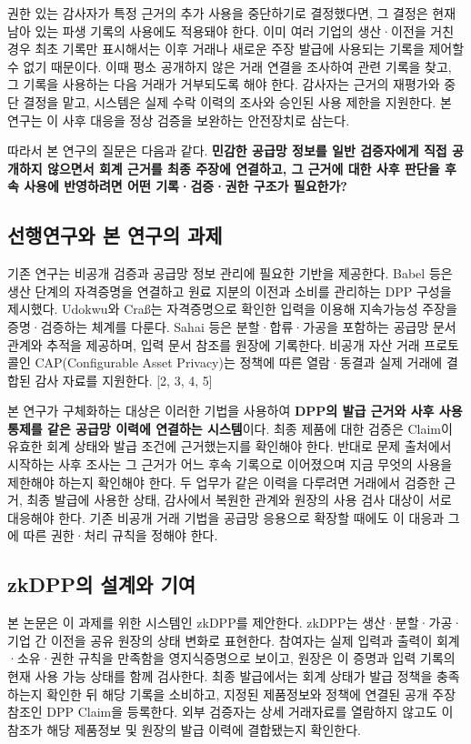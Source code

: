 권한 있는 감사자가 특정 근거의 추가 사용을 중단하기로 결정했다면, 그 결정은 현재 남아 있는 파생 기록의 사용에도 적용돼야 한다.
이미 여러 기업의 생산·이전을 거친 경우 최초 기록만 표시해서는 이후 거래나 새로운 주장 발급에 사용되는 기록을 제어할 수 없기 때문이다.
이때 평소 공개하지 않은 거래 연결을 조사하여 관련 기록을 찾고, 그 기록을 사용하는 다음 거래가 거부되도록 해야 한다.
감사자는 근거의 재평가와 중단 결정을 맡고, 시스템은 실제 수락 이력의 조사와 승인된 사용 제한을 지원한다.
본 연구는 이 사후 대응을 정상 검증을 보완하는 안전장치로 삼는다.

따라서 본 연구의 질문은 다음과 같다.
\textbf{민감한 공급망 정보를 일반 검증자에게 직접 공개하지 않으면서 회계 근거를 최종 주장에 연결하고, 그 근거에 대한 사후 판단을 후속 사용에 반영하려면 어떤 기록·검증·권한 구조가 필요한가?}


\subsection{선행연구와 본 연구의 과제}
기존 연구는 비공개 검증과 공급망 정보 관리에 필요한 기반을 제공한다.
Babel 등은 생산 단계의 자격증명을 연결하고 원료 지분의 이전과 소비를 관리하는 DPP 구성을 제시했다.
Udokwu와 Craß는 자격증명으로 확인한 입력을 이용해 지속가능성 주장을 증명·검증하는 체계를 다룬다.
Sahai 등은 분할·합류·가공을 포함하는 공급망 문서 관계와 추적을 제공하며, 입력 문서 참조를 원장에 기록한다.
비공개 자산 거래 프로토콜인 CAP(Configurable Asset Privacy)는 정책에 따른 열람·동결과 실제 거래에 결합된 감사 자료를 지원한다. [2, 3, 4, 5]

본 연구가 구체화하는 대상은 이러한 기법을 사용하여 \textbf{DPP의 발급 근거와 사후 사용 통제를 같은 공급망 이력에 연결하는 시스템}이다.
최종 제품에 대한 검증은 Claim이 유효한 회계 상태와 발급 조건에 근거했는지를 확인해야 한다.
반대로 문제 출처에서 시작하는 사후 조사는 그 근거가 어느 후속 기록으로 이어졌으며 지금 무엇의 사용을 제한해야 하는지 확인해야 한다.
두 업무가 같은 이력을 다루려면 거래에서 검증한 근거, 최종 발급에 사용한 상태, 감사에서 복원한 관계와 원장의 사용 검사 대상이 서로 대응해야 한다.
기존 비공개 거래 기법을 공급망 응용으로 확장할 때에도 이 대응과 그에 따른 권한·처리 규칙을 정해야 한다.


\subsection{zkDPP의 설계와 기여}
본 논문은 이 과제를 위한 시스템인 zkDPP를 제안한다.
zkDPP는 생산·분할·가공·기업 간 이전을 공유 원장의 상태 변화로 표현한다.
참여자는 실제 입력과 출력이 회계·소유·권한 규칙을 만족함을 영지식증명으로 보이고, 원장은 이 증명과 입력 기록의 현재 사용 가능 상태를 함께 검사한다.
최종 발급에서는 회계 상태가 발급 정책을 충족하는지 확인한 뒤 해당 기록을 소비하고, 지정된 제품정보와 정책에 연결된 공개 주장 참조인 DPP Claim을 등록한다.
외부 검증자는 상세 거래자료를 열람하지 않고도 이 참조가 해당 제품정보 및 원장의 발급 이력에 결합됐는지 확인한다.

